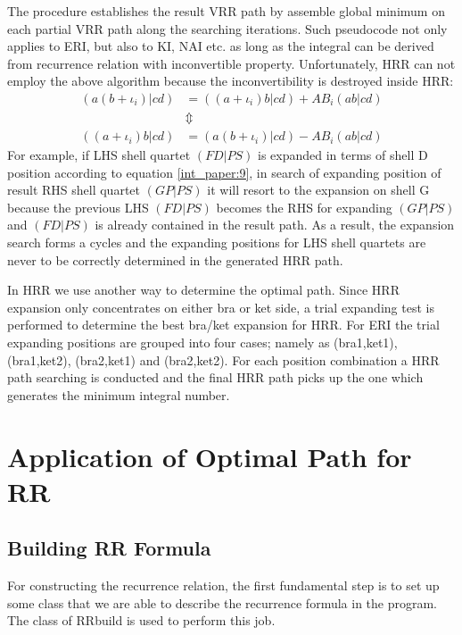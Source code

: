 The procedure establishes the result VRR path by assemble global minimum on each partial VRR
path along the searching iterations. Such pseudocode not only applies to ERI, but also to
KI, NAI etc. as long as the integral can be derived from recurrence relation with inconvertible
property. Unfortunately, HRR can not employ the above algorithm because the inconvertibility 
is destroyed inside HRR:
\begin{align}
\label{int_paper:9}
 (a(b+\iota_{i})|cd) &= ((a+\iota_{i})b|cd) + AB_{i}(ab|cd)   \nonumber \\
                     &\Updownarrow                            \nonumber \\
 ((a+\iota_{i})b|cd) &= (a(b+\iota_{i})|cd) - AB_{i}(ab|cd)   
\end{align}
For example, if LHS shell quartet $(FD|PS)$ is expanded in terms of shell D position according 
to equation \ref{int_paper:9}, in search of expanding position of result RHS shell quartet $(GP|PS)$
it will resort to the expansion on shell G because the previous LHS $(FD|PS)$ becomes the RHS for
expanding $(GP|PS)$ and $(FD|PS)$ is already contained in the result path. As a result, the expansion 
search forms a cycles and the expanding positions for LHS shell quartets are never to be correctly 
determined in the generated HRR path.

In HRR we use another way to determine the optimal path. Since HRR expansion only concentrates on
either bra or ket side, a trial expanding test is performed to determine the best bra/ket 
expansion for HRR. For ERI the trial expanding positions are grouped into four cases; namely 
as (bra1,ket1), (bra1,ket2), (bra2,ket1) and (bra2,ket2). For each position combination a HRR 
path searching is conducted and the final HRR path picks up the one which generates the minimum
integral number.

\section{Application of Optimal Path for RR}

\subsection{Building RR Formula}
\label{rrbuild}
%
%
For constructing the recurrence relation, the first fundamental step is to set up some class
that we are able to describe the recurrence formula in the program. The class of RRbuild
is used to perform this job.

